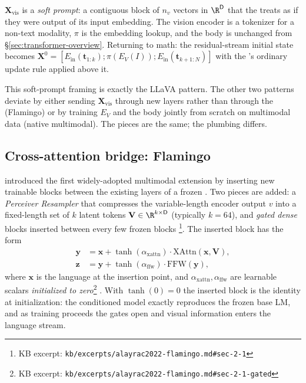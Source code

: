 \begin{intuition}
$\mathbf{X}_{\text{vis}}$ is a \emph{soft prompt}: a contiguous block of
$n_v$ vectors in $\R^{\mathsf{D}}$ that the  treats as if they were
output of its input embedding. The vision encoder is a tokenizer for a
non-text modality, $\pi$ is the embedding lookup, and the  body is
unchanged from \S\ref{sec:transformer-overview}. Returning to math:
the residual-stream initial state becomes $\mathbf{X}^0 =
[E_{\text{in}}(\mathbf{t}_{1:k}); \pi(E_V(I)); E_{\text{in}}(\mathbf{t}_{k+1:N})]$
with the 's ordinary update rule applied above it.
\end{intuition}

This soft-prompt framing is exactly the LLaVA pattern. The other two
patterns deviate by either sending $\mathbf{X}_{\text{vis}}$ through new
\emph{} layers rather than through the 
(Flamingo) or by training $E_V$ and the  body jointly from scratch on
multimodal data (native multimodal). The pieces are the same; the
plumbing differs.

\subsection{Cross-attention bridge: Flamingo}
\label{sec:multimodal-flamingo}

\citet{alayrac2022-flamingo} introduced the first widely-adopted
multimodal extension by inserting new trainable blocks between the
existing layers of a frozen . Two pieces are added: a
\emph{Perceiver Resampler} that compresses the variable-length encoder
output $v$ into a fixed-length set of $k$ latent tokens
$\mathbf{V} \in \R^{k \times \mathsf{D}}$ (typically $k{=}64$),
and \emph{gated  dense} blocks
inserted between every few frozen  blocks%
\footnote{KB excerpt: \nolinkurl{kb/excerpts/alayrac2022-flamingo.md#sec-2-1}}.
The inserted block has the form
\begin{align}
\mathbf{y} &= \mathbf{x} + \tanh(\alpha_{\text{xattn}}) \cdot \mathrm{XAttn}(\mathbf{x},\mathbf{V}), \label{eq:flamingo-xattn}\\
\mathbf{z} &= \mathbf{y} + \tanh(\alpha_{\text{ffw}}) \cdot \mathrm{FFW}(\mathbf{y}),  \label{eq:flamingo-ffw}
\end{align}
where $\mathbf{x}$ is the language  at the insertion point,
and $\alpha_{\text{xattn}}, \alpha_{\text{ffw}}$ are learnable scalars
\emph{initialized to zero}\footnote{KB excerpt:
\nolinkurl{kb/excerpts/alayrac2022-flamingo.md#sec-2-1-gated}}
\citep{alayrac2022-flamingo}. With $\tanh(0){=}0$ the inserted block
is the identity at initialization: the conditioned model exactly
reproduces the frozen base LM, and as training proceeds the gates open
and visual information enters the language stream.

